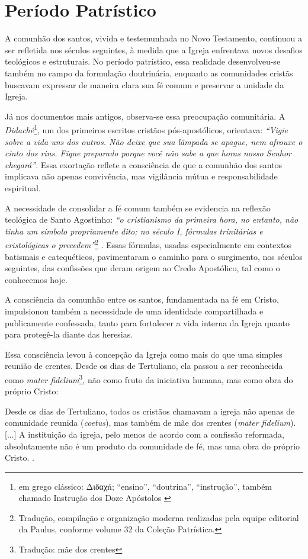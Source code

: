 \section{Período Patrístico}

A comunhão dos santos, vivida e testemunhada no Novo Testamento, continuou a ser refletida nos séculos seguintes, à medida que a Igreja enfrentava novos desafios teológicos e estruturais. No período patrístico, essa realidade desenvolveu-se também no campo da formulação doutrinária, enquanto as comunidades cristãs buscavam expressar de maneira clara sua fé comum e preservar a unidade da Igreja.

Já nos documentos mais antigos, observa-se essa preocupação comunitária. A \textit{Didaché}\footnote{em grego clássico: \foreignlanguage{greek}{Διδαχń}; ``ensino'', ``doutrina'', ``instrução'', também chamado Instrução dos Doze Apóstolos \cite{wikididaque}}, um dos primeiros escritos cristãos pós-apostólicos, orientava: \textit{``Vigie sobre a vida uns dos outros. Não deixe que sua lâmpada se apague, nem afrouxe o cinto dos rins. Fique preparado porque você não sabe a que horas nosso Senhor chegará''}\cite{didachePaulus2013}. Essa exortação reflete a consciência de que a comunhão dos santos implicava não apenas convivência, mas vigilância mútua e responsabilidade espiritual.

A necessidade de consolidar a fé comum também se evidencia na reflexão teológica de Santo Agostinho: \textit{``o cristianismo da primeira hora, no entanto, não tinha um símbolo propriamente dito; no século I, fórmulas trinitárias e cristológicas o precedem''}\footnote{Tradução, compilação e organização moderna realizadas pela equipe editorial da Paulus, conforme volume 32 da Coleção Patrística.} \cite[p. 8]{santos2013}. Essas fórmulas, usadas especialmente em contextos batismais e catequéticos, pavimentaram o caminho para o surgimento, nos séculos seguintes, das confissões que deram origem ao Credo Apostólico, tal como o conhecemos hoje.

A consciência da comunhão entre os santos, fundamentada na fé em Cristo, impulsionou também a necessidade de uma identidade compartilhada e publicamente confessada, tanto para fortalecer a vida interna da Igreja quanto para protegê-la diante das heresias.

Essa consciência levou à concepção da Igreja como mais do que uma simples reunião de crentes. Desde os dias de Tertuliano, ela passou a ser reconhecida como \textit{mater fidelium}\footnote{Tradução: mãe dos crentes}, não como fruto da iniciativa humana, mas como obra do próprio Cristo:
\begin{citacao}
Desde os dias de Tertuliano, todos os cristãos chamavam a igreja não apenas de comunidade reunida (\textit{coetus}), mas também de mãe dos crentes (\textit{mater fidelium}). [...] A instituição da igreja, pelo menos de acordo com a confissão reformada, absolutamente não é um produto da comunidade de fé, mas uma obra do próprio Cristo. \cite[335]{bavinck2012}.
\end{citacao}

